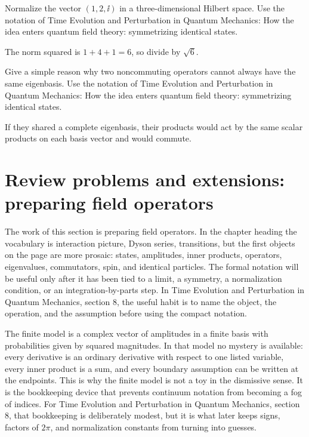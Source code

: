 \begin{exercise}
Normalize the vector \((1,2,\ii)\) in a three-dimensional Hilbert space.  Use the notation of Time Evolution and Perturbation in Quantum Mechanics: How the idea enters quantum field theory: symmetrizing identical states.
\begin{answer}
The norm squared is \(1+4+1=6\), so divide by \(\sqrt6\).
\end{answer}
\end{exercise}

\begin{exercise}
Give a simple reason why two noncommuting operators cannot always have the same eigenbasis.  Use the notation of Time Evolution and Perturbation in Quantum Mechanics: How the idea enters quantum field theory: symmetrizing identical states.
\begin{answer}
If they shared a complete eigenbasis, their products would act by the same scalar products on each basis vector and would commute.
\end{answer}
\end{exercise}



\section{Review problems and extensions: preparing field operators}

The work of this section is preparing field operators.  In the chapter heading the vocabulary is interaction picture, Dyson series, transitions, but the first objects on the page are more prosaic: states, amplitudes, inner products, operators, eigenvalues, commutators, spin, and identical particles.  The formal notation will be useful only after it has been tied to a limit, a symmetry, a normalization condition, or an integration-by-parts step.  In Time Evolution and Perturbation in Quantum Mechanics, section 8, the useful habit is to name the object, the operation, and the assumption before using the compact notation.

The finite model is a complex vector of amplitudes in a finite basis with probabilities given by squared magnitudes.  In that model no mystery is available: every derivative is an ordinary derivative with respect to one listed variable, every inner product is a sum, and every boundary assumption can be written at the endpoints.  This is why the finite model is not a toy in the dismissive sense.  It is the bookkeeping device that prevents continuum notation from becoming a fog of indices.  For Time Evolution and Perturbation in Quantum Mechanics, section 8, that bookkeeping is deliberately modest, but it is what later keeps signs, factors of \(2\pi\), and normalization constants from turning into guesses.

